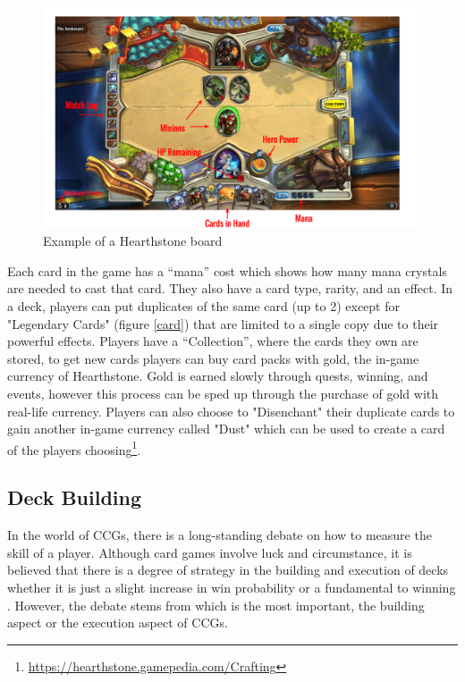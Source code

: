 \documentclass{report} %
\begin{document}
\begin{figure}[h]
\centering
\includegraphics[width=1\textwidth]{hearthstonegameboard}
\caption{Example of a Hearthstone board\protect\footnotemark}
 \label{board}
\end{figure}
	
	Each card in the game has a “mana” cost which shows how many mana crystals are needed to cast that card. They also have a card type, rarity, and an effect. In a deck, players can put duplicates of the same card (up to 2) except for "Legendary Cards" (figure \ref{card}) that are limited to a single copy due to their powerful effects.  Players have a “Collection”, where the cards they own are stored, to get new cards players can buy card packs with gold, the in-game currency of Hearthstone. Gold is earned slowly through quests, winning, and events, however this process can be sped up through the purchase of gold with real-life currency. Players can also choose to "Disenchant" their duplicate cards to gain another in-game currency called "Dust" which can be used to create a card of the players choosing\footnote{\url{https://hearthstone.gamepedia.com/Crafting}}.


\subsection{Deck Building}
	In the world of CCGs, there is a long-standing debate on how to measure the skill of a player. Although card games involve luck and circumstance, it is believed that there is a degree of strategy in the building and execution of decks whether it is just a slight increase in win probability or a fundamental to winning \cite{SvsL}. However, the debate stems from which is the most important, the building aspect or the execution aspect of CCGs.
	\cite{BvsP}
\end{document}
